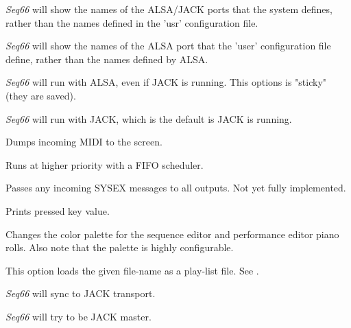      \textsl{Seq66} will show the names of the ALSA/JACK ports that the system
      defines, rather than the names defined in the 'usr' configuration file.

      \textsl{Seq66} will show the names of the ALSA port that the 'user'
      configuration file define, rather than the names defined by ALSA.



      \textsl{Seq66} will run with ALSA, even if JACK is running.
      This options is "sticky" (they are saved).

      \textsl{Seq66} will run with JACK, which is the default is JACK is
      running.


      Dumps incoming MIDI to the screen.

      Runs at higher priority with a FIFO scheduler.

      Passes any incoming SYSEX messages to all outputs.
		Not yet fully implemented.

      Prints pressed key value.

      Changes the color palette for the sequence editor and performance editor
      piano rolls.  Also note that the palette is highly configurable.


      This option loads the given file-name as a play-list file.
      See .



      \textsl{Seq66} will sync to JACK transport.


      \textsl{Seq66} will try to be JACK master.

